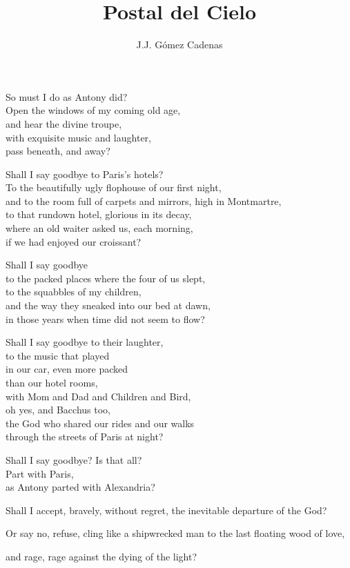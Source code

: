 \documentclass[12pt,twoside]{article}
\title{Postal del Cielo}
\author{J.J. Gómez Cadenas}
\begin{document}
\maketitle

\begin{poem}
\begin{stanza}
So must I do as Antony did?\\
Open the windows of my coming old age,\\
and hear the divine troupe,\\
with exquisite music and laughter,\\
pass beneath, and away?
\end{stanza}
\begin{stanza}
Shall I say goodbye to Paris's hotels?\\
To the beautifully ugly flophouse of our first night,\\
and to the room full of carpets and mirrors, high in Montmartre,\\
to that rundown hotel, glorious in its decay,\\
where an old waiter asked us, each morning,\\
if we had enjoyed our croissant?
\end{stanza}
\begin{stanza}
Shall I say goodbye\\
to the packed places where the four of us slept,\\
to the squabbles of my children,\\
and the way they sneaked into our bed at dawn,\\
in those years when time did not seem to flow?
\end{stanza}
\begin{stanza}
Shall I say goodbye to their laughter,\\
to the music that played\\
in our car, even more packed\\
than our hotel rooms,\\
with Mom and Dad and Children and Bird,\\
oh yes, and Bacchus too,\\
the God who shared our rides and our walks\\
through the streets of Paris at night?
\end{stanza}
\begin{stanza}
Shall I say goodbye? Is that all?\\
Part with Paris,\\
as Antony parted with Alexandria?
\end{stanza}
\begin{stanza}
Shall I accept, bravely, without regret, the inevitable departure of the God?
\end{stanza}
\begin{stanza}
Or say no, refuse, cling like a shipwrecked man to the last floating wood of love,
\end{stanza}
\begin{stanza}
and rage, rage against the dying of the light?
\end{stanza}
\end{poem}
\end{document}
